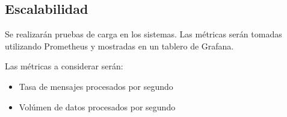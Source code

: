 \subsection{Escalabilidad}

Se realizarán pruebas de carga en los sistemas.
Las métricas serán tomadas utilizando Prometheus y mostradas en un tablero de Grafana.

Las métricas a considerar serán:
\begin{itemize}
    \item Tasa de mensajes procesados por segundo 
    \item Volúmen de datos procesados por segundo
\end{itemize}